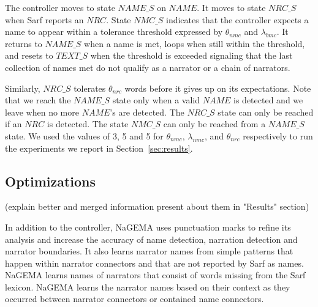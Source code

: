 \documentclass[11pt]{article}
\begin{document}
The controller moves to state $\mathit{NAME\_S}$ on
$\mathit{NAME}$.
It moves to state $\mathit{NRC\_S}$ 
when Sarf reports an $\mathit{NRC}$.
State $\mathit{NMC\_S}$
indicates that the controller expects a name to appear within 
a tolerance threshold expressed by 
$\theta_{\mathit{nmc}}$ and $\lambda_{\mathit{bmc}}$.
It returns to $\mathit{NAME\_S}$ when a name is met, 
loops when still within the threshold, and 
resets to $\mathit{TEXT\_S}$ when the threshold is exceeded 
signaling that the last collection of names met do not qualify
as a narrator or a chain of narrators. 

Similarly, $\mathit{NRC\_S}$ tolerates $\theta_{\mathit{nrc}}$ words 
before it gives up on its expectations. 
Note that we reach the $\mathit{NAME\_S}$
state only when a
valid $\mathit{NAME}$ is detected and we leave when no 
more $\mathit{NAME}$'s are detected.
The $\mathit{NRC\_S}$ state can only be reached if an 
$\mathit{NRC}$ is detected.
The state $\mathit{NMC\_S}$ can only be reached from a 
$\mathit{NAME\_S}$ state.
We used the values of 3, 5 and 5 for $\theta_{\mathit{nmc}}$, 
$\lambda_{\mathit{nmc}}$, and 
$\theta_{\mathit{nrc}}$ respectively to run the experiments 
we report in Section~\ref{sec:results}.

\begin{figure}[tb!]
\end{figure}


\subsection{Optimizations}

(explain better and merged information present about them in "Results" section)

In addition to the controller, 
NaGEMA uses punctuation marks to refine its analysis and 
increase the accuracy of name detection, narration detection and narrator boundaries. 
It also learns narrator names from simple patterns that 
happen within narrator connectors and that are not 
reported by Sarf as names. 
NaGEMA learns names of narrators that consist of words missing from 
the Sarf lexicon.
NaGEMA learns the narrator names based on their context as they occurred 
between narrator connectors or contained name connectors. 
\end{document}
